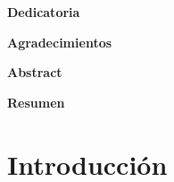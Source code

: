 \documentclass[12pt,letterpaper]{article}
\author{Ader Yasmir Zeas Rocha}
\date{\today}
\begin{document}
	
	
	
	
	\clearpage
	\begin{center}\bfseries Dedicatoria \end{center}
	\vspace{1cm} %
	
	\clearpage
	\begin{center}\bfseries Agradecimientos \end{center}
	\vspace{1cm}
	
	\clearpage
	\begin{center}\bfseries Abstract \end{center}
	\vspace{1cm}
	
	\clearpage
	\begin{center}\bfseries Resumen \end{center}
	\vspace{1cm}
	
	\clearpage
	\tableofcontents
	
	\clearpage
	
	\setcounter{section}{0} 
	
	
	\section{Introducción}
	
	
\end{document}
